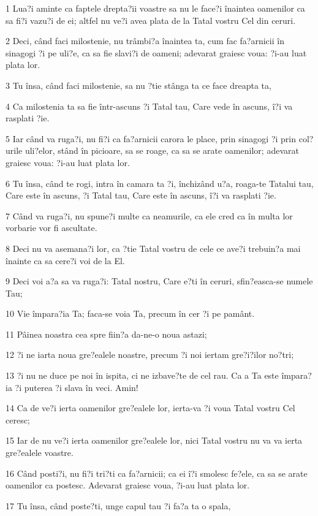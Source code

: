 \par 1 Lua?i aminte ca faptele drepta?ii voastre sa nu le face?i înaintea oamenilor ca sa fi?i vazu?i de ei; altfel nu ve?i avea plata de la Tatal vostru Cel din ceruri.
\par 2 Deci, când faci milostenie, nu trâmbi?a înaintea ta, cum fac fa?arnicii în sinagogi ?i pe uli?e, ca sa fie slavi?i de oameni; adevarat graiesc voua: ?i-au luat plata lor.
\par 3 Tu însa, când faci milostenie, sa nu ?tie stânga ta ce face dreapta ta,
\par 4 Ca milostenia ta sa fie într-ascuns ?i Tatal tau, Care vede în ascuns, î?i va rasplati ?ie.
\par 5 Iar când va ruga?i, nu fi?i ca fa?arnicii carora le place, prin sinagogi ?i prin col?urile uli?elor, stând în picioare, sa se roage, ca sa se arate oamenilor; adevarat graiesc voua: ?i-au luat plata lor.
\par 6 Tu însa, când te rogi, intra în camara ta ?i, închizând u?a, roaga-te Tatalui tau, Care este în ascuns, ?i Tatal tau, Care este în ascuns, î?i va rasplati ?ie.
\par 7 Când va ruga?i, nu spune?i multe ca neamurile, ca ele cred ca în multa lor vorbarie vor fi ascultate.
\par 8 Deci nu va asemana?i lor, ca ?tie Tatal vostru de cele ce ave?i trebuin?a mai înainte ca sa cere?i voi de la El.
\par 9 Deci voi a?a sa va ruga?i: Tatal nostru, Care e?ti în ceruri, sfin?easca-se numele Tau;
\par 10 Vie împara?ia Ta; faca-se voia Ta, precum în cer ?i pe pamânt.
\par 11 Pâinea noastra cea spre fiin?a da-ne-o noua astazi;
\par 12 ?i ne iarta noua gre?ealele noastre, precum ?i noi iertam gre?i?ilor no?tri;
\par 13 ?i nu ne duce pe noi în ispita, ci ne izbave?te de cel rau. Ca a Ta este împara?ia ?i puterea ?i slava în veci. Amin!
\par 14 Ca de ve?i ierta oamenilor gre?ealele lor, ierta-va ?i voua Tatal vostru Cel ceresc;
\par 15 Iar de nu ve?i ierta oamenilor gre?ealele lor, nici Tatal vostru nu va va ierta gre?ealele voastre.
\par 16 Când posti?i, nu fi?i tri?ti ca fa?arnicii; ca ei î?i smolesc fe?ele, ca sa se arate oamenilor ca postesc. Adevarat graiesc voua, ?i-au luat plata lor.
\par 17 Tu însa, când poste?ti, unge capul tau ?i fa?a ta o spala,
